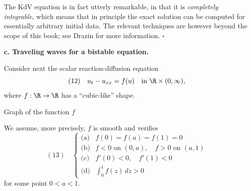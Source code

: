 \begin{remark}
\label{rem:kdv-complete-integrability}
The KdV equation is in fact utterly remarkable, in that it is \textit{completely integrable}, which means that in principle the exact solution can be computed for essentially arbitrary initial data. The relevant techniques are however beyond the scope of this book; see Drazin \cite{Drazin1983} for more information.
$\square$
\end{remark}

\textbf{c. Traveling waves for a bistable equation.}

Consider next the scalar reaction-diffusion equation
$$(12) \quad u_t - u_{xx} = f(u) \quad \text{in } \R \times (0,\infty),$$
where $f: \R \to \R$ has a ``cubic-like'' shape.

\begin{figure}[h]\centering
\end{figure}

\noindent Graph of the function $f$

We assume, more precisely, $f$ is smooth and verifies
$$
(13) \quad \begin{cases}
\text{(a)} & f(0) = f(a) = f(1) = 0 \\
\text{(b)} & f < 0 \text{ on } (0, a), \quad f > 0 \text{ on } (a, 1) \\
\text{(c)} & f'(0) < 0, \quad f'(1) < 0 \\
\text{(d)} & \int_0^1 f(z) \, dz > 0
\end{cases}
$$
for some point $0 < a < 1$.

